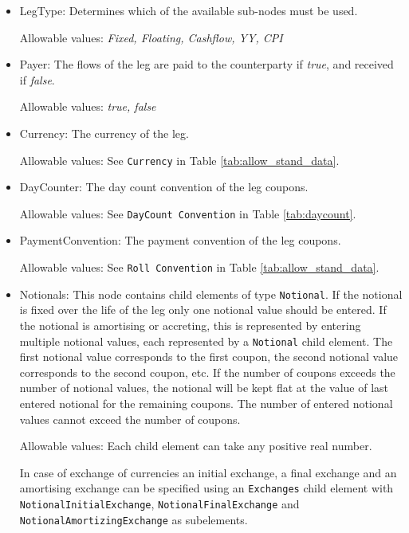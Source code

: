 \begin{itemize}
\item LegType:  Determines which of the available sub-nodes must be
  used. 

Allowable values:  \emph{Fixed, Floating, Cashflow, YY, CPI}

\item Payer:  The flows of the leg are paid to the counterparty if
  \emph{true}, and received if \emph{false}.  

Allowable values:  \emph{true, false} 

\item Currency: The currency of the leg. 

Allowable values:  See \lstinline!Currency! in Table \ref{tab:allow_stand_data}.

\item DayCounter: The day count convention of the leg coupons. 

Allowable values: See \lstinline!DayCount Convention! in Table \ref{tab:daycount}.

\item PaymentConvention: The payment convention of the leg coupons. 

Allowable values: See \lstinline!Roll Convention! in Table \ref{tab:allow_stand_data}.

\item Notionals: This node contains child elements of type
  \lstinline!Notional!. If the notional is fixed over the life of the
  leg only one notional value should be entered. If the notional is
  amortising or accreting, this is represented by entering multiple
  notional values, each represented by a \lstinline!Notional! child
  element. The first notional value corresponds to the first coupon,
  the second notional value corresponds to the second coupon, etc. If
  the number of coupons exceeds the number of notional values, the
  notional will be kept flat at the value of last entered notional for
  the remaining coupons.  The number of entered notional values cannot
  exceed the number of coupons.

Allowable values: Each child element can take any positive real number.

In case of exchange of currencies an initial exchange, a final exchange
and an amortising exchange can be specified using an \lstinline!Exchanges! child element with \break
\lstinline!NotionalInitialExchange!, \lstinline!NotionalFinalExchange! and \break
\lstinline!NotionalAmortizingExchange! as subelements.


\end{itemize}
